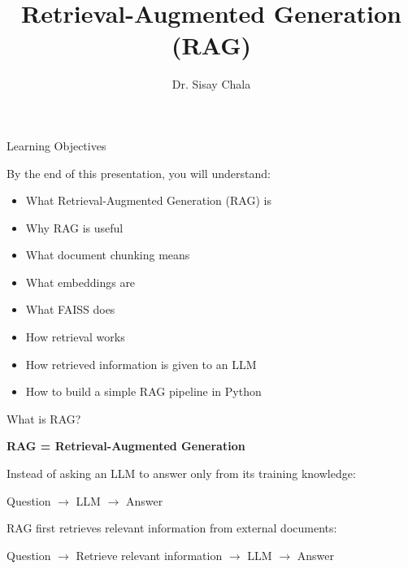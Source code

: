 \documentclass[aspectratio=169]{beamer}
\title{Retrieval-Augmented Generation (RAG)}
\author{Dr. Sisay Chala}
\begin{document}
\begin{frame}
    \titlepage
\end{frame}

\begin{frame}{Learning Objectives}

By the end of this presentation, you will understand:

\begin{itemize}[<+->]
    \item What Retrieval-Augmented Generation (RAG) is
    \item Why RAG is useful
    \item What document chunking means
    \item What embeddings are
    \item What FAISS does
    \item How retrieval works
    \item How retrieved information is given to an LLM
    \item How to build a simple RAG pipeline in Python
\end{itemize}

\end{frame}

\begin{frame}{What is RAG?}

\textbf{RAG = Retrieval-Augmented Generation}

Instead of asking an LLM to answer only from its training knowledge:

\begin{center}
\Large
Question $\rightarrow$ LLM $\rightarrow$ Answer
\end{center}

\vspace{0.5cm}

RAG first retrieves relevant information from external documents:

\begin{center}
\Large
Question
$\rightarrow$
Retrieve relevant information
$\rightarrow$
LLM
$\rightarrow$
Answer
\end{center}

\end{frame}
\end{document}
